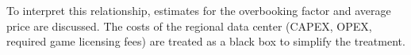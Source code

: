 To interpret this relationship, estimates for the overbooking factor and average price are discussed. The costs of the regional data center (\gls{CAPEX}, \gls{OPEX}, required game licensing fees) are treated as a black box to simplify the treatment.








